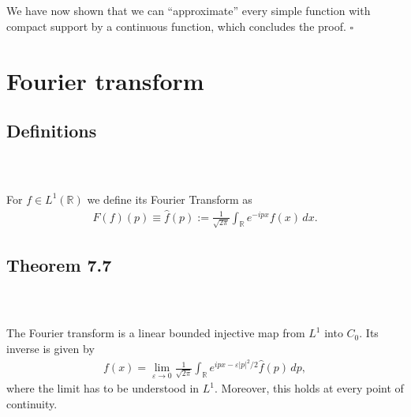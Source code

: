 \documentclass{beamer}
\numberwithin{equation}{section}
\begin{document}
\begin{frame}\frametitle{{\normalsize \secname} \\ {\large \subsecname}}
    We have now shown that we can ``approximate'' every simple function with compact support by a continuous function, which concludes the proof. \hfill $\square$
\end{frame}

\section{Fourier transform}

\subsection{Definitions}

\begin{frame}\frametitle{{\normalsize \secname} \\ {\large \subsecname}}
    \begin{definition}
        For $f \in L^1(\mathbb{R})$ we define its Fourier Transform as
        \begin{align}
            F(f)(p) \equiv \hat{f}(p) := \frac{1}{\sqrt{2\pi}} \int_\mathbb{R} e^{-ipx}f(x) \, dx.
        \end{align}
    \end{definition}
\end{frame}

\subsection{Theorem 7.7}

\begin{frame}\frametitle{{\normalsize \secname} \\ {\large \subsecname}}
    \begin{theorem}[7.7]
        The Fourier transform is a linear bounded injective map from $L^1$ into $C_0$.
        Its inverse is given by
        \begin{align}\label{eq:rainbow_star}
            f(x) = \lim_{\varepsilon \rightarrow 0} \frac{1}{\sqrt{2 \pi}} \int_\mathbb{R} e^{ipx - \varepsilon |p|^2/2} \hat{f}(p) \, dp,
        \end{align}
        where the limit has to be understood in $L^1$.
        Moreover, this holds at every point of continuity.
    \end{theorem}
\end{frame}
\end{document}
